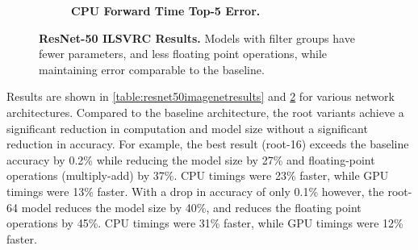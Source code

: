 \documentclass[thesis]{subfiles}
\begin{document}
\begin{figure}[p]
\begin{subfigure}[b]{\textwidth}
			\centering
			\caption{\textbf{CPU Forward Time \vs Top-5 Error.}}
			\label{fig:resnet5050cpuforward}
		\end{subfigure}
		
		\caption[ResNet-50 ILSVRC results.]{\textbf{ResNet-50 ILSVRC Results.} Models with filter groups have fewer parameters, and less floating point operations, while maintaining error comparable to the baseline.}
		\label{fig:resnet50plots}
	\end{figure}
	Results are shown in \cref{table:resnet50imagenetresults} and \cref{fig:resnet50plots} for various network architectures. Compared to the baseline architecture, the root variants achieve a significant reduction in computation and model size without a significant reduction in accuracy. For example, the best result (root-16) exceeds the baseline accuracy by 0.2\% while reducing the model size by 27\% and floating-point operations (multiply-add) by 37\%. CPU timings were 23\% faster, while GPU timings were 13\% faster. With a drop in accuracy of only 0.1\% however, the root-64 model reduces the model size by 40\%, and reduces the floating point operations by 45\%. CPU timings were 31\% faster, while GPU timings were 12\% faster. 
	
\end{document}
